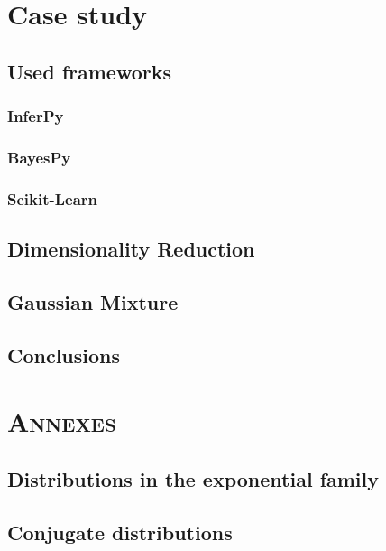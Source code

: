 \documentclass[twoside,openright,titlepage,numbers=noenddot,openany,headinclude,footinclude=true, cleardoublepage=empty,abstractoff,BCOR=5mm,paper=a4,fontsize=11pt, dvipsnames]{scrreprt}
\begin{document}
\part{Case study}

\chapter{Used frameworks}

\section{InferPy}

\section{BayesPy}

\section{Scikit-Learn}


\chapter{Dimensionality Reduction}


\chapter{Gaussian Mixture}


\chapter{Conclusions}


\ctparttext{
  \color{black}
  \begin{center}

  \end{center}
}
\part*{\textsc{Annexes}}

\appendix
\chapter{Distributions in the exponential family}\label{ap:exp_fam}


\chapter{Conjugate distributions}\label{ap:conj_distr}



\clearpage

\printglossary[title={\textsc{notation}}]
\glsaddallunused

\clearpage
\nocite{*}


\end{document}
